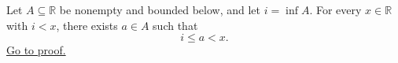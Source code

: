 \begin{lemma}
\label{lem:infimum-strict-lower-approximation}
Let $A\subseteq\mathbb{R}$ be nonempty and bounded below, and let
$i=\inf A$.  For every $x\in\mathbb{R}$ with $i<x$, there exists
$a\in A$ such that
\[
i\le a<x.
\]
\hyperref[prf:infimum-strict-lower-approximation]{Go to proof.}
\end{lemma}